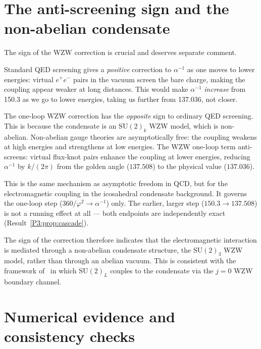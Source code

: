 \documentclass[11pt,a4paper]{article}
\theoremstyle{definition}
\theoremstyle{remark}
\newcommand{\vp}{\varphi}
\newcommand{\aInv}{\alpha^{-1}}
\begin{document}
\section{The anti-screening sign and the non-abelian condensate}
\label{P3:sec:sign}

The sign of the WZW correction is crucial and deserves separate comment.

Standard QED screening gives a \emph{positive} correction to $\aInv$
as one moves to lower energies: virtual $e^+e^-$ pairs in the vacuum
screen the bare charge, making the coupling appear weaker at long
distances.  This would make $\aInv$ \emph{increase} from 150.3 as
we go to lower energies, taking us further from 137.036, not closer.

The one-loop WZW correction has the \emph{opposite} sign to ordinary QED
screening. This is because the condensate is an $\mathrm{SU}(2)_k$ WZW
model, which is non-abelian. Non-abelian gauge theories are
asymptotically free: the coupling weakens at high energies and
strengthens at low energies. The WZW one-loop term anti-screens:
virtual flux-knot pairs enhance the coupling at lower energies, reducing
$\aInv$ by $k/(2\pi)$ from the golden angle ($137.508$) to the physical
value ($137.036$).

This is the same mechanism as asymptotic freedom in QCD, but for the
electromagnetic coupling in the icosahedral condensate background. It
governs the one-loop step ($360/\vp^2\to\aInv$) only. The earlier,
larger step ($150.3\to137.508$) is not a running effect at all --- both
endpoints are independently exact (Result~\ref{P3:prop:cascade}).

The sign of the correction therefore indicates that the electromagnetic
interaction is mediated through a non-abelian condensate structure, 
the $\mathrm{SU}(2)_3$ WZW model, rather than through an
abelian vacuum.  This is consistent with the framework of~\cite{Paper1}
in which $\mathrm{SU}(2)_L$ couples to the condensate via the $j=0$
WZW boundary channel.

\section{Numerical evidence and consistency checks}
\label{P3:sec:numerics}
\end{document}
